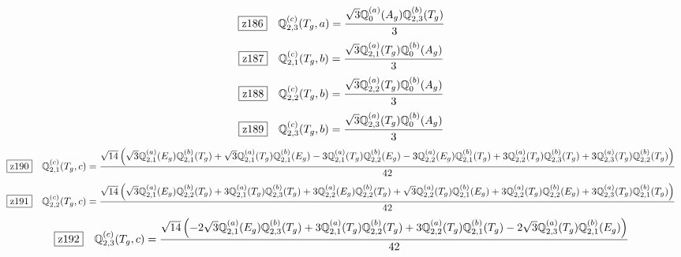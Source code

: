 \documentclass[fleqn,10pt,landscape]{jsarticle}
\begin{document}
\begin{dmath*}
\hspace*{3mm}\fbox{z186}\quad \mathbb{Q}_{2,3}^{(c)}(T_{g},a)=\frac{\sqrt{3} \mathbb{Q}_{0}^{(a)}(A_{g}) \mathbb{Q}_{2,3}^{(b)}(T_{g})}{3}
\end{dmath*}
\begin{dmath*}
\hspace*{3mm}\fbox{z187}\quad \mathbb{Q}_{2,1}^{(c)}(T_{g},b)=\frac{\sqrt{3} \mathbb{Q}_{2,1}^{(a)}(T_{g}) \mathbb{Q}_{0}^{(b)}(A_{g})}{3}
\end{dmath*}
\begin{dmath*}
\hspace*{3mm}\fbox{z188}\quad \mathbb{Q}_{2,2}^{(c)}(T_{g},b)=\frac{\sqrt{3} \mathbb{Q}_{2,2}^{(a)}(T_{g}) \mathbb{Q}_{0}^{(b)}(A_{g})}{3}
\end{dmath*}
\begin{dmath*}
\hspace*{3mm}\fbox{z189}\quad \mathbb{Q}_{2,3}^{(c)}(T_{g},b)=\frac{\sqrt{3} \mathbb{Q}_{2,3}^{(a)}(T_{g}) \mathbb{Q}_{0}^{(b)}(A_{g})}{3}
\end{dmath*}
\begin{dmath*}
\hspace*{3mm}\fbox{z190}\quad \mathbb{Q}_{2,1}^{(c)}(T_{g},c)=\frac{\sqrt{14} \left(\sqrt{3} \mathbb{Q}_{2,1}^{(a)}(E_{g}) \mathbb{Q}_{2,1}^{(b)}(T_{g}) + \sqrt{3} \mathbb{Q}_{2,1}^{(a)}(T_{g}) \mathbb{Q}_{2,1}^{(b)}(E_{g}) - 3 \mathbb{Q}_{2,1}^{(a)}(T_{g}) \mathbb{Q}_{2,2}^{(b)}(E_{g}) - 3 \mathbb{Q}_{2,2}^{(a)}(E_{g}) \mathbb{Q}_{2,1}^{(b)}(T_{g}) + 3 \mathbb{Q}_{2,2}^{(a)}(T_{g}) \mathbb{Q}_{2,3}^{(b)}(T_{g}) + 3 \mathbb{Q}_{2,3}^{(a)}(T_{g}) \mathbb{Q}_{2,2}^{(b)}(T_{g})\right)}{42}
\end{dmath*}
\begin{dmath*}
\hspace*{3mm}\fbox{z191}\quad \mathbb{Q}_{2,2}^{(c)}(T_{g},c)=\frac{\sqrt{14} \left(\sqrt{3} \mathbb{Q}_{2,1}^{(a)}(E_{g}) \mathbb{Q}_{2,2}^{(b)}(T_{g}) + 3 \mathbb{Q}_{2,1}^{(a)}(T_{g}) \mathbb{Q}_{2,3}^{(b)}(T_{g}) + 3 \mathbb{Q}_{2,2}^{(a)}(E_{g}) \mathbb{Q}_{2,2}^{(b)}(T_{g}) + \sqrt{3} \mathbb{Q}_{2,2}^{(a)}(T_{g}) \mathbb{Q}_{2,1}^{(b)}(E_{g}) + 3 \mathbb{Q}_{2,2}^{(a)}(T_{g}) \mathbb{Q}_{2,2}^{(b)}(E_{g}) + 3 \mathbb{Q}_{2,3}^{(a)}(T_{g}) \mathbb{Q}_{2,1}^{(b)}(T_{g})\right)}{42}
\end{dmath*}
\begin{dmath*}
\hspace*{3mm}\fbox{z192}\quad \mathbb{Q}_{2,3}^{(c)}(T_{g},c)=\frac{\sqrt{14} \left(- 2 \sqrt{3} \mathbb{Q}_{2,1}^{(a)}(E_{g}) \mathbb{Q}_{2,3}^{(b)}(T_{g}) + 3 \mathbb{Q}_{2,1}^{(a)}(T_{g}) \mathbb{Q}_{2,2}^{(b)}(T_{g}) + 3 \mathbb{Q}_{2,2}^{(a)}(T_{g}) \mathbb{Q}_{2,1}^{(b)}(T_{g}) - 2 \sqrt{3} \mathbb{Q}_{2,3}^{(a)}(T_{g}) \mathbb{Q}_{2,1}^{(b)}(E_{g})\right)}{42}
\end{dmath*}
\end{document}
